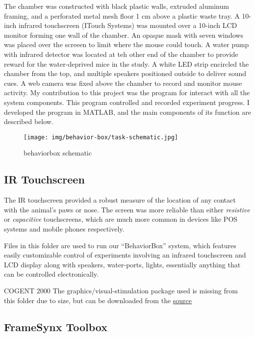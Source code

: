 \documentclass[
  12pt,
]{report}
\numberwithin{figure}{section}
\numberwithin{table}{section}
\numberwithin{equations}{section}
\begin{document}
The chamber was constructed with black plastic walls, extruded aluminum
framing, and a perforated metal mesh floor 1 cm above a plastic waste
tray. A 10-inch infrared touchscreen (ITouch Systems) was mounted over a
10-inch LCD monitor forming one wall of the chamber. An opaque mask with
seven windows was placed over the screeen to limit where the mouse could
touch. A water pump with infrared detector was located at teh other end
of the chamber to provide reward for the water-deprived mice in the
study. A white LED strip encircled the chamber from the top, and
multiple speakers positioned outside to deliver sound cues. A web camera
was fixed above the chamber to record and monitor mouse activity. My
contribution to this project was the program for interact with all the
system components. This program controlled and recorded experiment
progress. I developed the program in MATLAB, and the main components of
its function are described below.

\begin{figure}
\centering
\texttt{[image: img/behavior-box/task-schematic.jpg]}
\caption{behaviorbox schematic}
\end{figure}

\hypertarget{sec:ir-touchscreen}{%
\subsection{IR Touchscreen}\label{sec:ir-touchscreen}}

The IR touchscreen provided a robust measure of the location of any
contact with the animal's paws or nose. The screen was more reliable
than either \emph{resistive} or \emph{capacitive} touchscreens, which
are much more common in devices like POS systems and mobile phones
respectively.

Files in this folder are used to run our ``BehaviorBox'' system, which
features easily customizable control of experiments involving an
infrared touchscreen and LCD display along with speakers, water-ports,
lights, essentially anything that can be controlled electronically.

COGENT 2000 The graphics/visual-stimulation package used is missing from
this folder due to size, but can be downloaded from the
\href{http://www.vislab.ucl.ac.uk/cogent_2000.php}{source}

\hypertarget{sec:framesynx-toolbox}{%
\subsection{FrameSynx Toolbox}\label{sec:framesynx-toolbox}}
\end{document}
